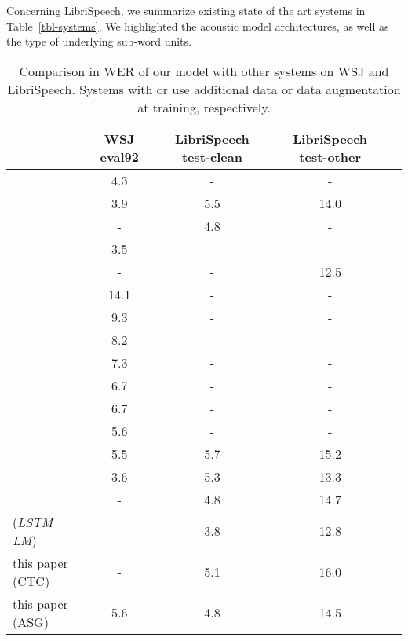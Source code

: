 \documentclass{article}
\begin{document}
Concerning LibriSpeech, we summarize existing state of the art systems in
Table~\ref{tbl-systems}. We highlighted the acoustic model architectures,
as well as the type of underlying sub-word units.

\begin{table}
    \caption{Comparison in WER of our model with other systems on
      WSJ and LibriSpeech. Systems with  or  use additional data or
      data augmentation at training, respectively.}
    \label{tbl-best-wer}
    \begin{center}
      \small
    \begin{tabular}{lcccc}
      \toprule
      & WSJ eval92 & LibriSpeech test-clean & LibriSpeech test-other \\ \midrule
      \citep{povey2016mmi} & 4.3 & - & - \\
      \citep{panayotov2015librispeech} & 3.9 & 5.5 & 14.0 \\
      \citep{peddinti2015time} & - & 4.8 & - \\
      \citep{chan2015rnn} & 3.5 & - & - \\
      \citep{ko2015audio} & - & - & 12.5 \\
      \midrule
      \citep{hannun2014birec} & 14.1 & - & - \\
      \citep{bahdanau2016attention} & 9.3 & - & - \\
      \citep{graves2014towards} & 8.2 & - & - \\
      \citep{miao2015eesen} & 7.3 & - & - \\
      \citep{chorowski2016seqseq} & 6.7 & - & - \\
      \citep{gramctc} & 6.7 & - & - \\
      \citep{hori2017multi} & 5.6 & - & - \\
      \citep{zhou2018policy} & 5.5 & 5.7 & 15.2 \\
      \citep{amodei2015deep} & 3.6 & 5.3 & 13.3 \\
      \citep{zeyer2018improved} & - & 4.8 & 14.7 \\
      \citep{zeyer2018improved} (\emph{LSTM LM}) & - & 3.8 & 12.8 \\
      \midrule
      this paper (CTC) & - & 5.1 & 16.0 \\
      this paper (ASG) & 5.6 & 4.8 & 14.5 \\
      \bottomrule
    \end{tabular}
    \end{center}
\end{table}
\end{document}
